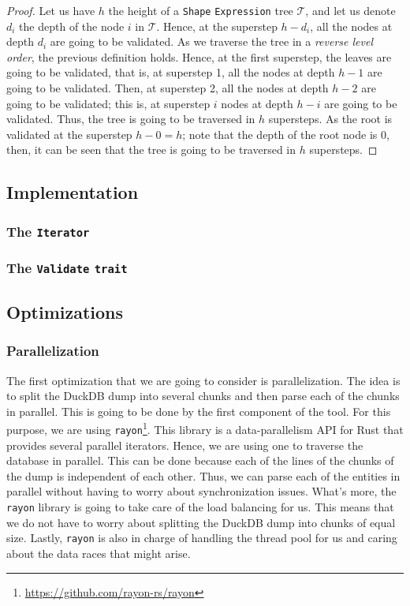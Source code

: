 \begin{proof}
    Let us have $h$ the height of a \texttt{Shape} \texttt{Expression} tree $\mathcal{T}$, and let us denote $d_i$ the depth of the node $i$ in $\mathcal{T}$. Hence, at the superstep $h - d_i$, all the nodes at depth $d_i$ are going to be validated. As we traverse the tree in a \textit{reverse level order}, the previous definition holds. Hence, at the first superstep, the leaves are going to be validated, that is, at superstep 1, all the nodes at depth $h - 1$ are going to be validated. Then, at superstep 2, all the nodes at depth $h - 2$ are going to be validated; this is, at superstep $i$ nodes at depth $h - i$ are going to be validated. Thus, the tree is going to be traversed in $h$ supersteps. As the root is validated at the superstep $h - 0 = h$; note that the depth of the root node is 0, then, it can be seen that the tree is going to be traversed in $h$ supersteps.
\end{proof}

\subsection{Implementation}

\subsubsection{The \texttt{Iterator}}

\subsubsection{The \texttt{Validate} \texttt{trait}}

\subsection{Optimizations}

\subsubsection{Parallelization}

The first optimization that we are going to consider is parallelization. The idea is to split the DuckDB dump into several chunks and then parse each of the chunks in parallel. This is going to be done by the first component of the tool. For this purpose, we are using \texttt{rayon}\footnote{\url{https://github.com/rayon-rs/rayon}}. This library is a data-parallelism API for Rust that provides several parallel iterators. Hence, we are using one to traverse the database in parallel. This can be done because each of the lines of the chunks of the dump is independent of each other. Thus, we can parse each of the entities in parallel without having to worry about synchronization issues. What's more, the \texttt{rayon} library is going to take care of the load balancing for us. This means that we do not have to worry about splitting the DuckDB dump into chunks of equal size. Lastly, \texttt{rayon} is also in charge of handling the thread pool for us and caring about the data races that might arise.

